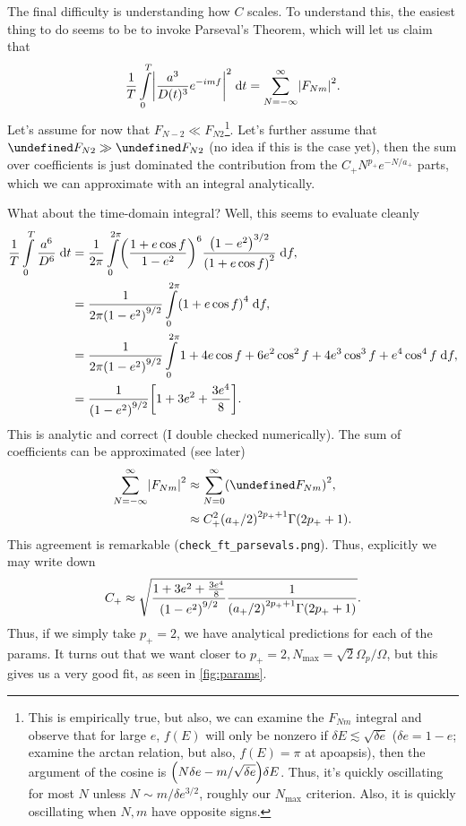 \documentclass[11pt,
        usenames, %
        dvipsnames %
    ]{article}
\let\Re\undefined
\let\Im\undefined
\DeclareMathOperator{\Re}{Re}
\DeclareMathOperator{\Im}{Im}
\DeclarePairedDelimiter\abs{\lvert}{\rvert}
\DeclarePairedDelimiter\p{\lparen}{\rparen}
\DeclarePairedDelimiter\s{\lbrack}{\rbrack}
\begin{document}
The final difficulty is understanding how $C$ scales. To understand this, the
easiest thing to do seems to be to invoke Parseval's Theorem, which will let us
claim that
\begin{equation}
    \frac{1}{T}\int\limits_{0}^T \abs*{\frac{a^3}{D(t)^3}e^{-imf}}^2
            \;\mathrm{d}t =
        \sum\limits_{N = -\infty}^\infty \abs*{F_{Nm}}^2.
\end{equation}
Let's assume for now that $F_{N-2} \ll F_{N2}$\footnote{This is empirically
true, but also, we can examine the $F_{Nm}$ integral and observe that for large
$e$, $f(E)$ will only be nonzero if $\delta E \lesssim \sqrt{\delta e}$
($\delta e = 1 - e$; examine the arctan relation, but also, $f(E) = \pi$ at
apoapsis), then the argument of the cosine is $\p*{N \delta e - m/\sqrt{\delta
e}} \delta E$. Thus, it's quickly oscillating for most $N$ unless $N \sim
m/\delta e^{3/2}$, roughly our $N_{\max}$ criterion. Also, it is quickly
oscillating when $N, m$ have opposite signs.}. Let's further assume that $\Re
F_{N2} \gg \Im F_{N2}$ (no idea if this is the case yet), then the sum over
coefficients is just dominated the contribution from the $C_+ N^{p_+}e^{-N/a_+}$
parts, which we can approximate with an integral analytically.

What about the time-domain integral? Well, this seems to evaluate cleanly
\begin{align}
    \frac{1}{T}\int\limits_0^T \frac{a^6}{D^6}\;\mathrm{d}t &= \frac{1}{2\pi}
        \int\limits_{0}^{2\pi} \p*{\frac{1 + e\cos f}{1 - e^2}}^6
            \frac{\p*{1 - e^2}^{3/2}}{\p*{1 + e\cos f}^2}\;\mathrm{d}f,\\
        &= \frac{1}{2\pi\p*{1 - e^2}^{9/2}}\int\limits_0^{2\pi}
            \p*{1 + e\cos f}^4\;\mathrm{d}f,\\
        &= \frac{1}{2\pi\p*{1 - e^2}^{9/2}}\int\limits_0^{2\pi}
            1 + 4e\cos f + 6e^2\cos^2f + 4e^3\cos^3f + e^4\cos^4f\;\mathrm{d}f
                ,\\
        &= \frac{1}{\p*{1 - e^2}^{9/2}}\s*{
            1 + 3e^2 + \frac{3e^4}{8}}.
\end{align}
This is analytic and correct (I double checked numerically). The sum of
coefficients can be approximated (see later)
\begin{align}
    \sum\limits_{N = -\infty}^\infty \abs*{F_{Nm}}^2 &\approx
            \sum\limits_{N = 0}^\infty \p*{\Re F_{Nm}}^2,\\
        &\approx C_+^2 \p*{a_+ / 2}^{2p_+ + 1}\Gamma\p*{2 p_+ + 1}.
\end{align}
This agreement is remarkable (\lstinline{check_ft_parsevals.png}). Thus,
explicitly we may write down
\begin{equation}
    C_+ \approx \sqrt{\frac{ 1 + 3e^2 + \frac{3e^4}{8}}{\p*{1 - e^2}^{9/2}}
        \frac{1}{\p*{a_+/2}^{2p_+ + 1} \Gamma\p*{2 p_+ + 1}}}.
\end{equation}
Thus, if we simply take $p_+ = 2$, we have analytical predictions for each of
the params. It turns out that we want closer to $p_+ = 2, N_{\max} =
\sqrt{2}\Omega_p/\Omega$, but this gives us a very good fit, as seen in
\autoref{fig:params}.
\end{document}
